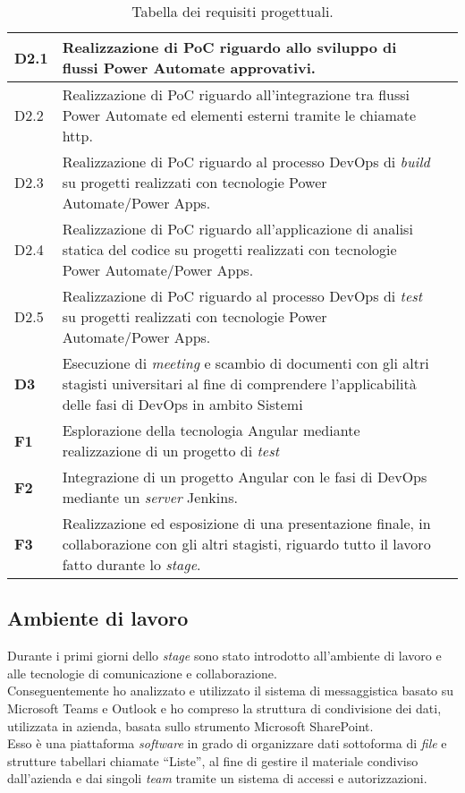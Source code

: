 \begin{table}[htbp]
\begin{tabularx}{\textwidth}{|l|X|l|}
    \hline D2.1  & Realizzazione di PoC riguardo allo sviluppo di flussi Power Automate approvativi.\\
    \hline D2.2  & Realizzazione di PoC riguardo all'integrazione tra flussi Power Automate ed elementi esterni tramite le chiamate \gls{http}.\\
    \hline D2.3  & Realizzazione di PoC riguardo al processo \gls{DevOps} di \emph{build} su progetti realizzati con tecnologie Power Automate/Power Apps.\\
    \hline D2.4  & Realizzazione di PoC riguardo all'applicazione di analisi statica del codice su progetti realizzati con tecnologie Power Automate/Power Apps.\\
    \hline D2.5  & Realizzazione di PoC riguardo al processo \gls{DevOps} di \emph{test} su progetti realizzati con tecnologie Power Automate/Power Apps.\\
    \hline \textbf{D3}  & Esecuzione di \emph{meeting} e scambio di documenti con gli altri stagisti universitari al fine di comprendere l'applicabilità delle fasi di \gls{DevOps} in ambito \gls{Sistemi} \\
    \hline
    \hline \textbf{F1}  & Esplorazione della tecnologia Angular mediante realizzazione di un progetto di \emph{test}\\
    \hline \textbf{F2}  & Integrazione di un progetto Angular con le fasi di \gls{DevOps} mediante un \emph{server} Jenkins.\\
    \hline \textbf{F3}  & Realizzazione ed esposizione di una presentazione finale, in collaborazione con gli altri stagisti, riguardo tutto il lavoro fatto durante lo \emph{stage}.\\
    \hline
    \end{tabularx}
    \caption{Tabella dei requisiti progettuali.}
\end{table}%
\subsection{Ambiente di lavoro}
Durante i primi giorni dello \emph{stage} sono stato introdotto all'ambiente di lavoro e alle tecnologie di comunicazione e collaborazione.\\
Conseguentemente ho analizzato e utilizzato il sistema di messaggistica basato su Microsoft Teams e Outlook e ho compreso la struttura di condivisione dei dati, utilizzata in azienda, basata sullo strumento Microsoft SharePoint.\\
Esso è una piattaforma \emph{software} in grado di organizzare dati sottoforma di \emph{file} e strutture tabellari chiamate “Liste”, al fine di gestire il materiale condiviso dall'azienda e dai singoli \emph{team} tramite un sistema di accessi e autorizzazioni.\\

